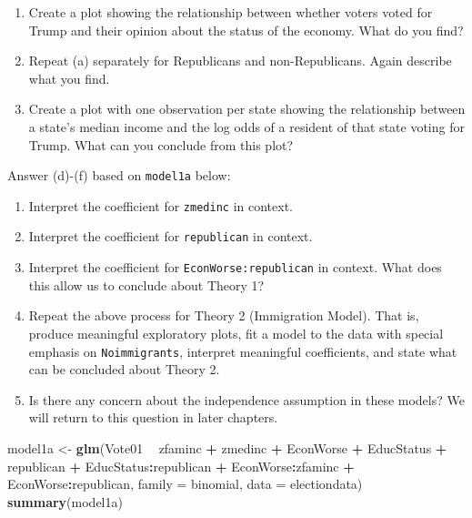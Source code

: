 \documentclass[
]{krantz}
\newenvironment{Shaded}{\begin{snugshade}}{\end{snugshade}}
\newcommand{\DataTypeTok}[1]{\textcolor[rgb]{0.27,0.27,0.27}{#1}}
\newcommand{\KeywordTok}[1]{\textcolor[rgb]{0.27,0.27,0.27}{\textbf{#1}}}
\newcommand{\NormalTok}[1]{#1}
\newcommand{\OperatorTok}[1]{\textcolor[rgb]{0.43,0.43,0.43}{\textbf{#1}}}
\newcommand{\StringTok}[1]{\textcolor[rgb]{0.5,0.5,0.5}{#1}}
\providecommand{\tightlist}{%
  \setlength{\itemsep}{0pt}\setlength{\parskip}{0pt}}
\begin{document}
\begin{enumerate}
  \begin{enumerate}
  \def\labelenumii{\alph{enumii}.}
  \tightlist
  \item
    Create a plot showing the relationship between whether voters voted for Trump and their opinion about the status of the economy. What do you find?
  \item
    Repeat (a) separately for Republicans and non-Republicans. Again describe what you find.
  \item
    Create a plot with one observation per state showing the relationship between a state's median income and the log odds of a resident of that state voting for Trump. What can you conclude from this plot?
  \end{enumerate}

  Answer (d)-(f) based on \texttt{model1a} below:

  \begin{enumerate}
  \def\labelenumii{\alph{enumii}.}
  \setcounter{enumii}{3}
  \tightlist
  \item
    Interpret the coefficient for \texttt{zmedinc} in context.
  \item
    Interpret the coefficient for \texttt{republican} in context.
  \item
    Interpret the coefficient for \texttt{EconWorse:republican} in context. What does this allow us to conclude about Theory 1?\\
  \item
    Repeat the above process for Theory 2 (Immigration Model). That is, produce meaningful exploratory plots, fit a model to the data with special emphasis on \texttt{Noimmigrants}, interpret meaningful coefficients, and state what can be concluded about Theory 2.
  \item
    Is there any concern about the independence assumption in these models? We will return to this question in later chapters.
  \end{enumerate}
\end{enumerate}

\begin{Shaded}
\begin{Highlighting}[]
\NormalTok{model1a <-}\StringTok{ }\KeywordTok{glm}\NormalTok{(Vote01 }\OperatorTok{~}\StringTok{ }\NormalTok{zfaminc }\OperatorTok{+}\StringTok{ }\NormalTok{zmedinc }\OperatorTok{+}\StringTok{ }\NormalTok{EconWorse }\OperatorTok{+}
\StringTok{    }\NormalTok{EducStatus }\OperatorTok{+}\StringTok{ }\NormalTok{republican }\OperatorTok{+}\StringTok{ }\NormalTok{EducStatus}\OperatorTok{:}\NormalTok{republican }\OperatorTok{+}
\StringTok{    }\NormalTok{EconWorse}\OperatorTok{:}\NormalTok{zfaminc }\OperatorTok{+}\StringTok{ }\NormalTok{EconWorse}\OperatorTok{:}\NormalTok{republican, }
    \DataTypeTok{family =}\NormalTok{ binomial, }\DataTypeTok{data =}\NormalTok{ electiondata)}
\KeywordTok{summary}\NormalTok{(model1a)}
\end{Highlighting}
\end{Shaded}
\end{document}
